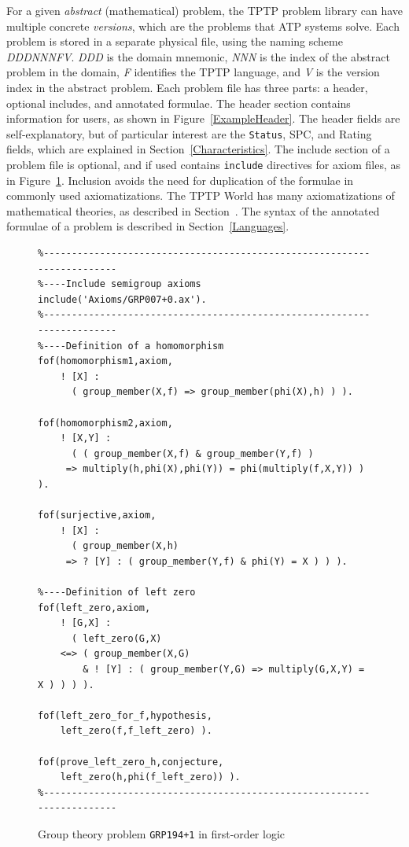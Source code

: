 \documentclass[runningheads]{llncs}
\begin{document}
For a given {\em abstract} (mathematical) problem, the TPTP problem library can have multiple 
concrete {\em versions}, which are the problems that ATP systems solve. 
Each problem is stored in a separate physical file, using the naming scheme {\em DDDNNNFV}.
{\em DDD} is the domain mnemonic, {\em NNN} is the index of the abstract problem in the domain,
{\em F} identifies the TPTP language, and {\em V} is the version index in the abstract problem.
Each problem file has three parts: a header, optional includes, and annotated formulae.
The header section contains information for users, as shown in Figure~\ref{ExampleHeader}.
The header fields are self-explanatory, but of particular interest are the {\tt Status}, SPC,
and Rating fields, which are explained in Section~\ref{Characteristics}.
The include section of a problem file is optional, and if used contains {\tt include} directives 
for axiom files, as in Figure~\ref{ExampleFOF}.
Inclusion avoids the need for duplication of the formulae in commonly used axiomatizations.
The TPTP World has many axiomatizations of mathematical theories, as described in 
Section~.
The syntax of the annotated formulae of a problem is described in Section~\ref{Languages}.

\begin{figure}[h!]
\centering
{\footnotesize
{\setlength{\baselineskip}{3mm}
\begin{verbatim}
%------------------------------------------------------------------------
%----Include semigroup axioms
include('Axioms/GRP007+0.ax').
%------------------------------------------------------------------------
%----Definition of a homomorphism
fof(homomorphism1,axiom,
    ! [X] :
      ( group_member(X,f) => group_member(phi(X),h) ) ).

fof(homomorphism2,axiom,
    ! [X,Y] :
      ( ( group_member(X,f) & group_member(Y,f) )
     => multiply(h,phi(X),phi(Y)) = phi(multiply(f,X,Y)) ) ).

fof(surjective,axiom,
    ! [X] :
      ( group_member(X,h)
     => ? [Y] : ( group_member(Y,f) & phi(Y) = X ) ) ).

%----Definition of left zero
fof(left_zero,axiom,
    ! [G,X] :
      ( left_zero(G,X)
    <=> ( group_member(X,G)
        & ! [Y] : ( group_member(Y,G) => multiply(G,X,Y) = X ) ) ) ).

fof(left_zero_for_f,hypothesis,
    left_zero(f,f_left_zero) ).

fof(prove_left_zero_h,conjecture,
    left_zero(h,phi(f_left_zero)) ).
%------------------------------------------------------------------------
\end{verbatim}
}}
\caption{Group theory problem {\tt GRP194+1} in first-order logic}
\label{ExampleFOF}
\end{figure}
\end{document}
